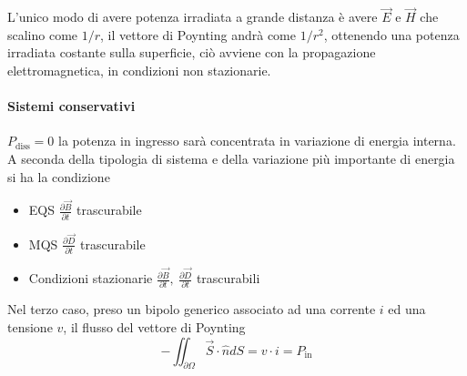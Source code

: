 L'unico modo di avere potenza irradiata a grande distanza è avere $\vec{E}$ e $\vec{H}$ che scalino come $1/r$,
il vettore di Poynting andrà come $1/r^2$, ottenendo una potenza irradiata costante sulla superficie, ciò
avviene con la propagazione elettromagnetica, in condizioni non stazionarie.

\newpage
\paragraph{Sistemi conservativi} $P_\text{diss} = 0$ la potenza in ingresso sarà concentrata in variazione di
energia interna.
A seconda della tipologia di sistema e della variazione più importante di energia si ha la condizione 
\begin{itemize}
\item EQS $\frac{\partial \vec{B}}{\partial t}$ trascurabile
\item MQS $\frac{\partial \vec{D}}{\partial t}$ trascurabile
\item Condizioni stazionarie $\frac{\partial \vec{B}}{\partial t},\ \frac{\partial \vec{D}}{\partial t}$ trascurabili
\end{itemize}
Nel terzo caso, preso un bipolo generico associato ad una corrente $i$ ed una tensione $v$, il flusso
del vettore di Poynting
$$
-\iint_{\partial\Omega} \vec{S}\cdot\hat{n}dS = v\cdot i = P_\text{in}
$$
